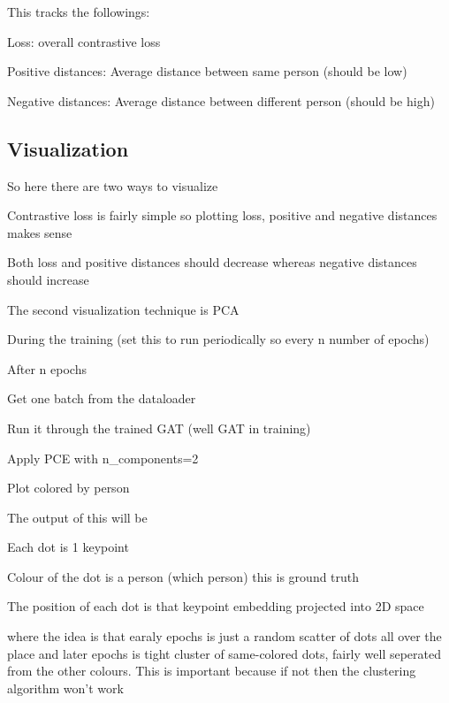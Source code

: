 This tracks the followings:

Loss: overall contrastive loss

Positive distances: Average distance between same person (should be low)

Negative distances: Average distance between different person (should be high)

\subsection{Visualization}

So here there are two ways to visualize

Contrastive loss is fairly simple so plotting loss, positive and negative distances makes sense

Both loss and positive distances should decrease whereas negative distances should increase

The second visualization technique is PCA

During the training (set this to run periodically so every n number of epochs)

\begin{compactitem}
	\item After n epochs 
	\item Get one batch from the dataloader 
	\item Run it through the trained GAT (well GAT in training)
	\item Apply PCE with n\_components=2
	\item Plot colored by person
\end{compactitem}

The output of this will be 

\begin{compactitem}
	\item Each dot is 1 keypoint
	\item Colour of the dot is a person (which person) this is ground truth
	\item The position of each dot is that keypoint embedding projected into 2D space
\end{compactitem}

where the idea is that earaly epochs is just a random scatter of dots all over the place
and later epochs is tight cluster of same-colored dots, fairly well seperated from the other colours. This
is important because if not then the clustering algorithm won't work
